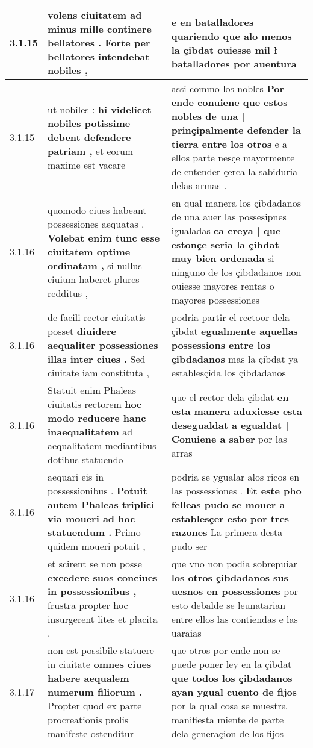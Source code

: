 \begin{tabular}{|p{1cm}|p{6.5cm}|p{6.5cm}|}
3.1.15 & volens ciuitatem \textbf{ ad minus mille continere bellatores . } Forte per bellatores intendebat nobiles , & e en batalladores quariendo \textbf{ que alo menos la çibdat ouiesse mil ł batalladores } por auentura \\\hline
3.1.15 & ut nobiles : \textbf{ hi videlicet nobiles potissime debent defendere patriam , } et eorum maxime est vacare & assi commo los nobles \textbf{ Por ende conuiene que estos nobles de una | prinçipalmente defender la tierra entre los otros } e a ellos parte nesçe mayormente de entender çerca la sabiduria delas armas . \\\hline
3.1.16 & quomodo ciues habeant possessiones aequatas . \textbf{ Volebat enim tunc esse ciuitatem optime ordinatam , } si nullus ciuium haberet plures redditus , & en qual manera los çibdadanos de una auer las possesipnes igualadas \textbf{ ca creya | que estonçe seria la çibdat muy bien ordenada } si ninguno de los çibdadanos non ouiesse mayores rentas o mayores possessiones \\\hline
3.1.16 & de facili rector ciuitatis posset \textbf{ diuidere aequaliter possessiones illas inter ciues . } Sed ciuitate iam constituta , & podria partir el rectoor dela çibdat \textbf{ egualmente aquellas possessions entre los çibdadanos } mas la çibdat ya establesçida los çibdadanos \\\hline
3.1.16 & Statuit enim Phaleas ciuitatis rectorem \textbf{ hoc modo reducere hanc inaequalitatem } ad aequalitatem mediantibus dotibus statuendo & que el rector dela çibdat \textbf{ en esta manera aduxiesse esta desegualdat a egualdat | Conuiene a saber } por las arras \\\hline
3.1.16 & aequari eis in possessionibus . \textbf{ Potuit autem Phaleas triplici via moueri ad hoc statuendum . } Primo quidem moueri potuit , & podria se ygualar alos ricos en las possessiones . \textbf{ Et este pho felleas pudo se mouer a establesçer esto por tres razones } La primera desta pudo ser \\\hline
3.1.16 & et scirent se non posse \textbf{ excedere suos conciues in possessionibus , } frustra propter hoc insurgerent lites et placita . & que vno non podia sobrepuiar \textbf{ los otros çibdadanos sus uesnos en possessiones } por esto debalde se leunatarian entre ellos las contiendas e las uaraias \\\hline
3.1.17 & non est possibile statuere in ciuitate \textbf{ omnes ciues habere aequalem numerum filiorum . } Propter quod ex parte procreationis prolis manifeste ostenditur & que otros por ende non se puede poner ley en la çibdat \textbf{ que todos los çibdadanos ayan ygual cuento de fijos } por la qual cosa se muestra manifiesta miente de parte dela generaçion de los fijos \\\hline

\end{tabular}
